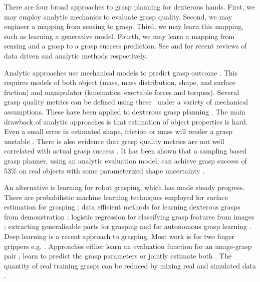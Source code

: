 There are four broad approaches to grasp planning for dexterous hands. First, we may employ analytic mechanics to evaluate grasp quality. Second, we may engineer a mapping from sensing to grasp. Third, we may learn this mapping, such as learning a generative model. Fourth, we may learn a mapping from sensing and a grasp to a grasp success prediction. See \cite{bohg2014data} and  \cite{sahbani2012overview} for recent reviews of data driven and analytic methods respectively.

Analytic approaches use mechanical models to predict grasp outcome \cite{bicchi2000a,Liu2000,Pollard2004,miller2004}. This requires models of both object (mass, mass distribution, shape, and surface friction) and manipulator (kinematics, exertable forces and torques). Several grasp quality metrics can be defined using these~\cite{Ferrari1992,Roa2015,Shimoga1996} under a variety of mechanical assumptions. These have been applied to dexterous grasp planning \cite{Boutselis2014,Gori2014,Hang2014,Rosales2012,Saut2012,ciocarlie2009hand}. The main drawback of analytic approaches is that estimation of object properties is hard. Even a small error in estimated shape, friction or mass will render a grasp unstable \cite{zheng2005a}. There is also evidence that grasp quality metrics are not well correlated with actual grasp success \cite{bekiroglu2011b,kim2013a,goins2014a}. It has been shown that a sampling based grasp planner, using an analytic evaluation model, can achieve grasp success of 53\% on real objects with some parameterized shape uncertainty \cite{li2016dexterous}.

An alternative is learning for robot grasping, which has made steady progress. There are probabilistic machine learning techniques employed for surface estimation for grasping \cite{dragiev2011gaussian}; data efficient methods for learning dexterous grasps from demonstration \cite{ben-amor2012a,kopicki2015ijrr,Osa2018}; logistic regression for classifying grasp features from images \cite{saxena2008a}; extracting generalisable parts for grasping \cite{detry2012a} and for autonomous grasp learning \cite{detry2010a}. Deep learning is a recent approach to grasping. Most work is for two finger grippers e.g. \cite{songiros20}. Approaches either learn an evaluation function for an image-grasp pair \cite{levine16,lenz2015deep,gualtieri2016high,mahler2017dex,pinto2016supersizing,johns2016deep}, learn to predict the grasp parameters \cite{redmon2015real,kumra2017iros} or jointly estimate both \cite{morrison18}. The quantity of real training grasps can be reduced by mixing real and simulated data \cite{bousmalis2017using}. 


